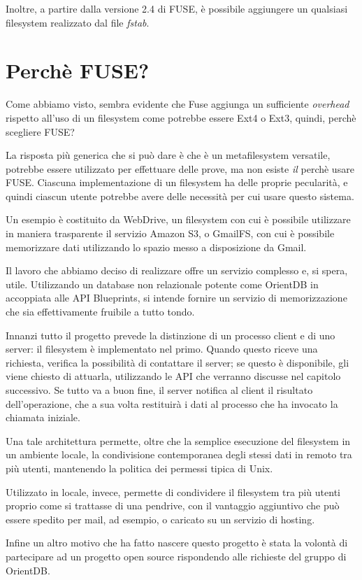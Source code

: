 Inoltre, a partire dalla versione 2.4 di FUSE, è possibile aggiungere un qualsiasi filesystem realizzato dal file \emph{fstab}.

\section{Perchè FUSE?}
Come abbiamo visto, sembra evidente che Fuse aggiunga un sufficiente \emph{overhead} rispetto all'uso di un filesystem come potrebbe essere Ext4 o Ext3, quindi, perchè scegliere FUSE?

La risposta più generica che si può dare è che è un metafilesystem versatile, potrebbe essere utilizzato per effettuare delle prove, ma non esiste \emph{il} perchè usare FUSE. Ciascuna implementazione di un filesystem ha delle proprie pecularità, e quindi ciascun utente potrebbe avere delle necessità per cui usare questo sistema.

Un esempio è costituito da WebDrive, un filesystem con cui è possibile utilizzare in maniera trasparente il servizio Amazon S3, o GmailFS, con cui è possibile memorizzare dati utilizzando lo spazio messo a disposizione da Gmail.

Il lavoro che abbiamo deciso di realizzare offre un servizio complesso e, si spera, utile. Utilizzando un database non relazionale potente come OrientDB in accoppiata alle API Blueprints, si intende fornire un servizio di memorizzazione che sia effettivamente fruibile a tutto tondo.

Innanzi tutto il progetto prevede la distinzione di un processo client e di uno server: il filesystem è implementato nel primo. Quando questo riceve una richiesta, verifica la possibilità di contattare il server; se questo è disponibile, gli viene chiesto di attuarla, utilizzando le API che verranno discusse nel capitolo successivo. Se tutto va a buon fine, il server notifica al client il risultato dell'operazione, che a sua volta restituirà i dati al processo che ha invocato la chiamata iniziale.

Una tale architettura permette, oltre che la semplice esecuzione del filesystem in un ambiente locale, la condivisione contemporanea degli stessi dati in remoto tra più utenti, mantenendo la politica dei permessi tipica di Unix.

Utilizzato in locale, invece, permette di condividere il filesystem tra più utenti proprio come si trattasse di una pendrive, con il vantaggio aggiuntivo che può essere spedito per mail, ad esempio, o caricato su un servizio di hosting.

Infine un altro motivo che ha fatto nascere questo progetto è stata la volontà di partecipare ad un progetto open source rispondendo alle richieste del gruppo di OrientDB.

